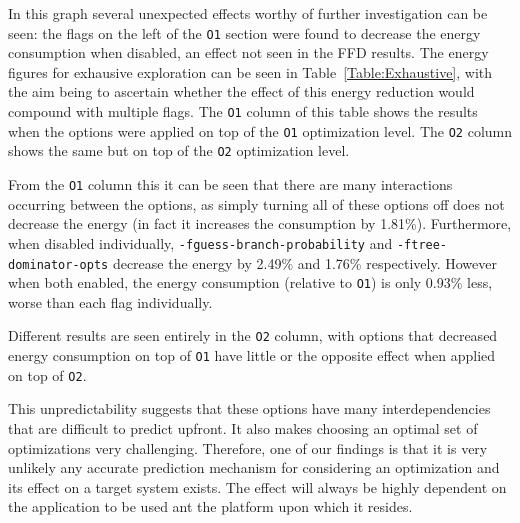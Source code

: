 \documentclass[twocolumn]{article}
\begin{document}
In this graph several unexpected effects worthy of further investigation can be seen: the flags on the left of the \texttt{O1} section were found to decrease the energy consumption when disabled, an effect not seen in the FFD results. The energy figures for exhausive exploration can be seen in Table~\ref{Table:Exhaustive}, with the aim being to ascertain whether the effect of this energy reduction would compound with multiple flags. The \texttt{O1} column of this table shows the results when the options were applied on top of the \texttt{O1} optimization level. The \texttt{O2} column shows the same but on top of the \texttt{O2} optimization level.

From the \texttt{O1} column this it can be seen that there are many interactions occurring between the options, as simply turning all of these options off does not decrease the energy (in fact it increases the consumption by 1.81\%). Furthermore, when disabled individually, \texttt{-fguess-branch-probability} and \texttt{-ftree-dominator-opts} decrease the energy by 2.49\% and 1.76\% respectively. However when both enabled, the energy consumption (relative to \texttt{O1}) is only 0.93\% less, worse than each flag individually.

Different results are seen entirely in the \texttt{O2} column, with options that decreased energy consumption on top of \texttt{O1} have little or the opposite effect when applied on top of \texttt{O2}.

This unpredictability suggests that these options have many interdependencies that are difficult to predict upfront. It also makes choosing an optimal set of optimizations very challenging. Therefore, one of our findings is that it is very unlikely any accurate prediction mechanism for considering an optimization and its effect on a target system exists. The effect will always be highly dependent on the application to be used ant the platform upon which it resides.
\end{document}
